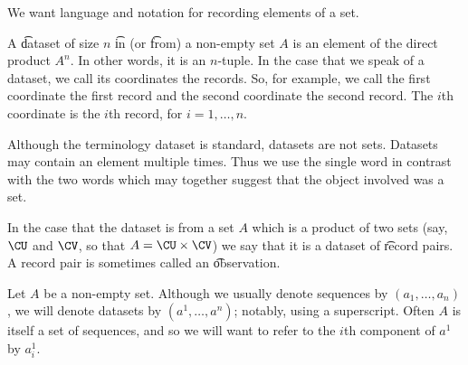 

We want language and notation for recording elements of a set.


A \t{dataset} of size $n$ \t{in} (or \t{from}) a non-empty set $A$ is an element of the direct product $A^n$.
In other words, it is an $n$-tuple.
In the case that we speak of a dataset, we call its coordinates the records.
So, for example, we call the first coordinate the first record and the second coordinate the second record.
The $i$th coordinate is the $i$th record, for $i = 1, \dots, n$.

Although the terminology dataset is standard, datasets are not sets.
Datasets may contain an element multiple times.
Thus we use the single word  in contrast with the two words  which may together suggest that the object involved was a set.

In the case that the dataset is from a set $A$ which is a product of two sets (say, $\CU$ and $\CV$, so that $A = \CU \times \CV$) we say that it is a dataset of \t{record pairs}.
A record pair is sometimes called an \t{observation}.


Let $A$ be a non-empty set.
Although we usually denote sequences by $(a_1, \dots, a_n)$, we will denote datasets by $(a^1, \dots, a^n)$; notably, using a superscript.
Often $A$ is itself a set of sequences, and so we will want to refer to the $i$th component of $a^1$ by $a^1_i$.

\blankpage
